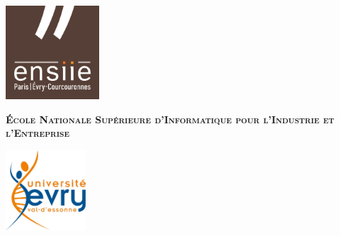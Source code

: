 \begin{titlepage}




\newcommand{\HRule}{\rule{\linewidth}{0.5mm}} %

\center %
 


\begin{minipage}[l]{0.2\columnwidth}
\includegraphics[width=3.5cm,height=3.5cm]{image/ENSIIE01.png}\\
\end{minipage}
\hfill
\begin{minipage}[l]{0.5\columnwidth}
\centering
\footnotesize
\textbf{\textsc{École Nationale Supérieure d'Informatique pour l'Industrie et l'Entreprise}}
\end{minipage}
\hfill
\begin{minipage}[l]{0.2\columnwidth}
\includegraphics[width=3cm,height=3cm]{image/normal.png}\\
\end{minipage}


\end{titlepage}
